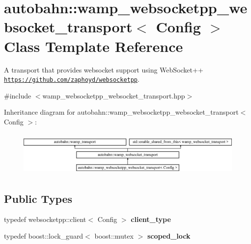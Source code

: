\hypertarget{classautobahn_1_1wamp__websocketpp__websocket__transport}{}\section{autobahn\+:\+:wamp\+\_\+websocketpp\+\_\+websocket\+\_\+transport$<$ Config $>$ Class Template Reference}
\label{classautobahn_1_1wamp__websocketpp__websocket__transport}


A transport that provides websocket support using Web\+Socket++ \href{https://github.com/zaphoyd/websocketpp}{\tt https\+://github.\+com/zaphoyd/websocketpp}.  




{\ttfamily \#include $<$wamp\+\_\+websocketpp\+\_\+websocket\+\_\+transport.\+hpp$>$}

Inheritance diagram for autobahn\+:\+:wamp\+\_\+websocketpp\+\_\+websocket\+\_\+transport$<$ Config $>$\+:\begin{figure}[H]
\begin{center}
\leavevmode
\includegraphics[height=2.245989cm]{classautobahn_1_1wamp__websocketpp__websocket__transport}
\end{center}
\end{figure}
\subsection*{Public Types}
\begin{DoxyCompactItemize}
\item 
typedef websocketpp\+::client$<$ Config $>$ {\bfseries client\+\_\+type}\hypertarget{classautobahn_1_1wamp__websocketpp__websocket__transport_a4cae6c2c127a0b80e128a5cbdb93edbc}{}\label{classautobahn_1_1wamp__websocketpp__websocket__transport_a4cae6c2c127a0b80e128a5cbdb93edbc}

\item 
typedef boost\+::lock\+\_\+guard$<$ boost\+::mutex $>$ {\bfseries scoped\+\_\+lock}\hypertarget{classautobahn_1_1wamp__websocketpp__websocket__transport_a24db5bbc3766d22da0553a64f5a529ea}{}\label{classautobahn_1_1wamp__websocketpp__websocket__transport_a24db5bbc3766d22da0553a64f5a529ea}

\end{DoxyCompactItemize}
